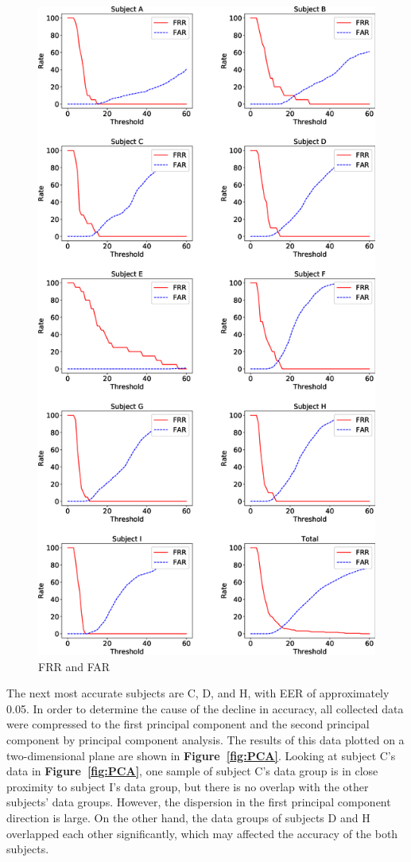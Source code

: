 \documentclass[sigchi,authordraft]{acmart}
\newcommand\figref[1]{\textbf{Figure~\ref{fig:#1}}}
\begin{document}
\begin{figure}[!t]
  \centering
    \includegraphics[width=1\linewidth]{figure/EER.eps}
  \caption{FRR and FAR}
  \label{fig:EER}
\end{figure}

The next most accurate subjects are C, D, and H, with EER of approximately 0.05. In order to determine the cause of the decline in accuracy, all collected data were compressed to the first principal component and the second principal component by principal component analysis. The results of this data plotted on a two-dimensional plane are shown in \figref{PCA}. Looking at subject C's data in \figref{PCA}, one sample of subject C's data group is in close proximity to subject I's data group, but there is no overlap with the other subjects' data groups. However, the dispersion in the first principal component direction is large. On the other hand, the data groups of subjects D and H overlapped each other significantly, which may affected the accuracy of the both subjects.\par
\end{document}
